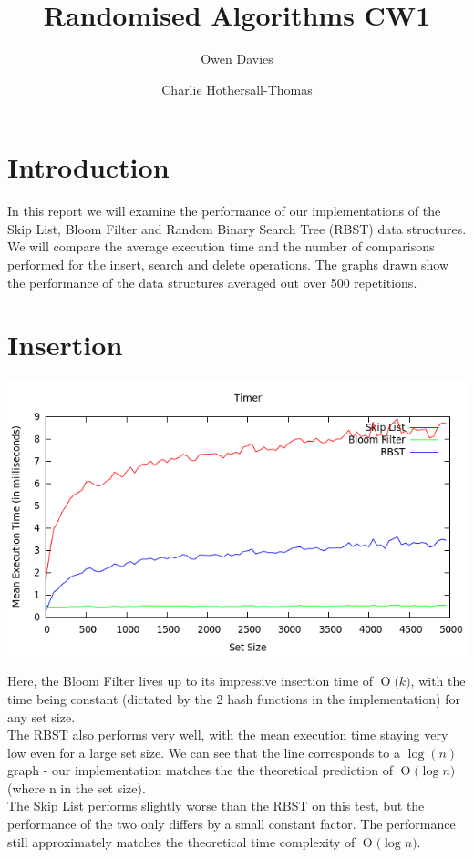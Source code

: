 \documentclass[11pt, notitlepage]{report}
\title{Randomised Algorithms CW1}
\date{}
\author{Owen Davies \and Charlie Hothersall-Thomas}
\newcommand{\BigO}[1]{\ensuremath{\operatorname{O}\bigl(#1\bigr)}}
\begin{document}
\maketitle

\section*{Introduction}

In this report we will examine the performance of our implementations of the Skip List, Bloom Filter and Random Binary Search Tree (RBST) data structures. We will compare the average execution time and the number of comparisons performed for the insert, search and delete operations. The graphs drawn show the performance of the data structures averaged out over 500 repetitions.

\section*{Insertion}

\includegraphics[width=\textwidth]{img/Timer-Add}

Here, the Bloom Filter lives up to its impressive insertion time of \BigO{k}, with the time being constant (dictated by the 2 hash functions in the implementation) for any set size.\\

The RBST also performs very well, with the mean execution time staying very low even for a large set size. We can see that the line corresponds to a $\log(n)$ graph - our implementation matches the the theoretical prediction of \BigO{\log n} (where n in the set size).\\

The Skip List performs slightly worse than the RBST on this test, but the performance of the two only differs by a small constant factor. The performance still approximately matches the theoretical time complexity of \BigO{\log n}.
\end{document}
